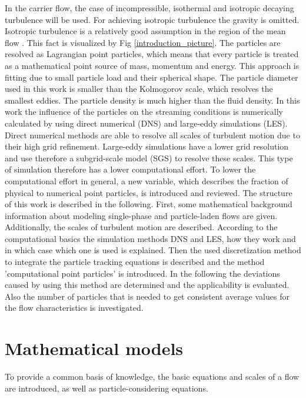 \documentclass[11pt,a4paper,openany,oneside,parskip=half*]{article}
\begin{document}
\newline
In the carrier flow, the case of incompressible, isothermal and isotropic decaying turbulence will be used. For achieving isotropic turbulence the gravity is omitted. Isotropic turbulence is a relatively good assumption in the region of the mean flow \cite{Kolmogorov1941}. This fact is visualized by Fig \ref{introduction_picture}.
The particles are resolved as Lagrangian point particles, which means that every particle is treated as a mathematical point source of mass, momentum and energy. This approach is fitting due to small particle load and their spherical shape. The particle diameter used in this work is smaller than the Kolmogorov scale, which resolves the smallest eddies. The particle density is much higher than the fluid density.
\newline
In this work the influence of the particles on the streaming conditions is numerically calculated by using direct numerical (DNS) and large-eddy simulations (LES). Direct numerical methods are able to resolve all scales of turbulent motion due to their high grid refinement. Large-eddy simulations have a lower grid resolution and use therefore a subgrid-scale model (SGS) to resolve these scales. This type of simulation therefore has a lower computational effort. To lower the computational effort in general, a new variable, which describes the fraction of physical to numerical point particles, is introduced and reviewed.
\newline
The structure of this work is described in the following. 
First, some mathematical background information about modeling single-phase and particle-laden flows are given. 
Additionally, the scales of turbulent motion are described.
According to the computational basics the simulation methods DNS and LES, how they work and in which case which one is used is explained.
Then the used discretization method to integrate the particle tracking equations is described and the method 'computational point particles' is introduced. 
In the following the deviations caused by using this method are determined and the applicability is evaluated.
Also the number of particles that is needed to get consistent average values for the flow characteristics is investigated.
\pagebreak
\section{Mathematical models}
To provide a common basis of knowledge, the basic equations and scales of a flow are introduced, as well as particle-considering equations.
\newline
\end{document}
